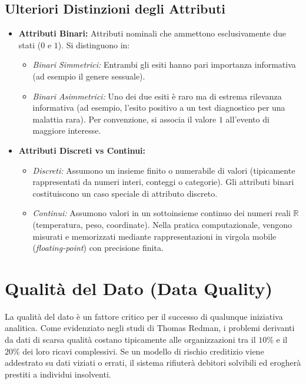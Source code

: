 \subsection{Ulteriori Distinzioni degli Attributi}
\begin{itemize}
    \item \textbf{Attributi Binari:} Attributi nominali che ammettono esclusivamente due stati ($0$ e $1$). Si distinguono in:
    \begin{itemize}
        \item \textit{Binari Simmetrici:} Entrambi gli esiti hanno pari importanza informativa (ad esempio il genere sessuale).
        \item \textit{Binari Asimmetrici:} Uno dei due esiti è raro ma di estrema rilevanza informativa (ad esempio, l'esito positivo a un test diagnostico per una malattia rara). Per convenzione, si associa il valore $1$ all'evento di maggiore interesse.
    \end{itemize}
    \item \textbf{Attributi Discreti vs Continui:}
    \begin{itemize}
        \item \textit{Discreti:} Assumono un insieme finito o numerabile di valori (tipicamente rappresentati da numeri interi, conteggi o categorie). Gli attributi binari costituiscono un caso speciale di attributo discreto.
        \item \textit{Continui:} Assumono valori in un sottoinsieme continuo dei numeri reali $\mathbb{R}$ (temperatura, peso, coordinate). Nella pratica computazionale, vengono misurati e memorizzati mediante rappresentazioni in virgola mobile (\textit{floating-point}) con precisione finita.
    \end{itemize}
\end{itemize}

\section{Qualità del Dato (Data Quality)}

La qualità del dato è un fattore critico per il successo di qualunque iniziativa analitica. Come evidenziato negli studi di Thomas Redman, i problemi derivanti da dati di scarsa qualità costano tipicamente alle organizzazioni tra il $10\%$ e il $20\%$ dei loro ricavi complessivi.
Se un modello di rischio creditizio viene addestrato su dati viziati o errati, il sistema rifiuterà debitori solvibili ed erogherà prestiti a individui insolventi.

